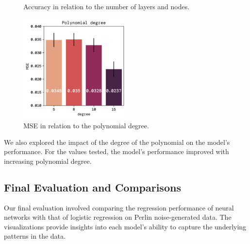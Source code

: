 \documentclass[twoside,11pt]{report}
\begin{document}
\begin{figure}[!ht]
\begin{minipage}[t]{0.5\textwidth - 1mm}
\begin{center}
            \end{center}
            \caption
            {
                Accuracy in relation to the number of layers and nodes.
            }\label{fig:MSE_layers_nodes}
        \end{minipage}
    \end{figure}

    \noindent


    \begin{figure}[!ht]
        \begin{center}
            \includegraphics[width=0.5\textwidth]{../runsAndFigures/MSE_degree.png}
        \end{center}
        \caption
        {
            MSE in relation to the polynomial degree.
        }\label{fig:}
    \end{figure}


    \newpage
    \noindent
    We also explored the impact of the degree of the polynomial on the model's performance.
    For the values tested, the model's performance improved with increasing polynomial degree.

\newpage
\newpage
\subsection*{Final Evaluation and Comparisons}
\label{sec:comparisons2}


    Our final evaluation involved comparing the regression performance of neural networks with that of logistic 
    regression on Perlin noise-generated data. The visualizations provide insights into each model's ability to 
    capture the underlying patterns in the data.
\end{document}
